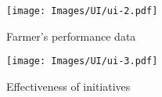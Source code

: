 
\begin{figure}[H]
	\centering
    \texttt{[image: Images/UI/ui-2.pdf]}
	\caption{\label{fig:ui_performance}Farmer's performance data}
\end{figure}

\begin{figure}[H]
	\centering
    \texttt{[image: Images/UI/ui-3.pdf]}
	\caption{\label{fig:ui_initiative}Effectiveness of initiatives}
\end{figure}